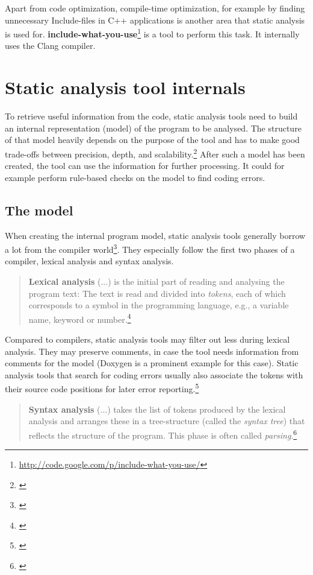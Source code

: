 Apart from code optimization, compile-time optimization, for example by finding unnecessary Include-files in C++ applications is another area that static analysis is used for. \textbf{include-what-you-use}\footnote{\url{http://code.google.com/p/include-what-you-use/}} is a tool to perform this task. It internally uses the Clang compiler.

\section{Static analysis tool internals}

To retrieve useful information from the code, static analysis tools need to build an internal representation (model) of the program to be analysed. The structure of that model heavily depends on the purpose of the tool and has to make good trade-offs between precision, depth, and scalability.\footnote{\citep[45]{SecureProgramming}} After such a model has been created, the tool can use the information for further processing. It could for example perform rule-based checks on the model to find coding errors.

\subsection{The model}

When creating the internal program model, static analysis tools generally borrow a lot from the compiler world\footnote{\citep[72]{SecureProgramming}}. They especially follow the first two phases of a compiler, lexical analysis and syntax analysis.

\begin{quotation}
\textbf{Lexical analysis} (...) is the initial part of reading and analysing the program text: The text is read and divided into \textit{tokens}, each of which corresponds to a symbol in the programming language, e.g., a variable name, keyword or number.\footnote{\citep[2]{CompilerBasics}}
\end{quotation}

Compared to compilers, static analysis tools may filter out less during lexical analysis. They may preserve comments, in case the tool needs information from comments for the model (Doxygen is a prominent example for this case).
Static analysis tools that search for coding errors usually also associate the tokens with their source code positions for later error reporting.\footnote{\citep[72]{SecureProgramming}} 

\begin{quotation}
\textbf{Syntax analysis} (...) takes the list of tokens produced by the lexical analysis and arranges these in a tree-structure (called the \textit{syntax tree}) that reflects the structure of the program. This phase is often called \textit{parsing}.\footnote{\citep[2]{CompilerBasics}}
\end{quotation}

